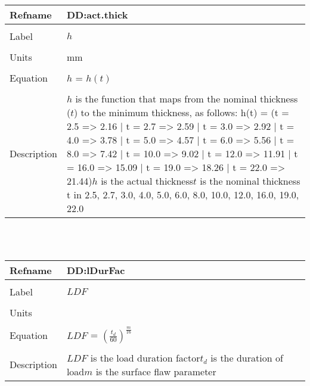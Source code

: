 \documentclass[12pt]{article}
\begin{document}
\noindent \begin{minipage}{\textwidth}
\begin{tabular}{p{} p{}}
\toprule \textbf{Refname} & \textbf{DD:act.thick}
\label{DD:act.thick}
\\ \midrule \\
Label & $h$
\\ \midrule \\
Units & mm
\\ \midrule \\
Equation & $h$ = $h(t)$
\\ \midrule \\
Description & $h$ is the  function that maps from the nominal thickness ($t$) to the minimum thickness, as follows: h(t) = (t = 2.5 => 2.16 | t = 2.7 => 2.59 | t = 3.0 => 2.92 | t = 4.0 => 3.78 | t = 5.0 => 4.57 | t = 6.0 => 5.56 | t = 8.0 => 7.42 | t = 10.0 => 9.02 | t = 12.0 => 11.91 | t = 16.0 => 15.09 | t = 19.0 => 18.26 | t = 22.0 => 21.44)\newline$h$ is the actual thickness\newline$t$ is the nominal thickness t in {2.5, 2.7, 3.0, 4.0, 5.0, 6.0, 8.0, 10.0, 12.0, 16.0, 19.0, 22.0}
\\ \bottomrule \end{tabular}
\end{minipage}\\
~\newline
\noindent \begin{minipage}{\textwidth}
\begin{tabular}{p{} p{}}
\toprule \textbf{Refname} & \textbf{DD:lDurFac}
\label{DD:lDurFac}
\\ \midrule \\
Label & $LDF$
\\ \midrule \\
Units & 
\\ \midrule \\
Equation & $LDF$ = $(\frac{t_{d}}{60})^{\frac{m}{16}}$
\\ \midrule \\
Description & $LDF$ is the load duration factor\newline$t_{d}$ is the duration of load\newline$m$ is the surface flaw parameter
\\ \bottomrule \end{tabular}
\end{minipage}\\
\end{document}
